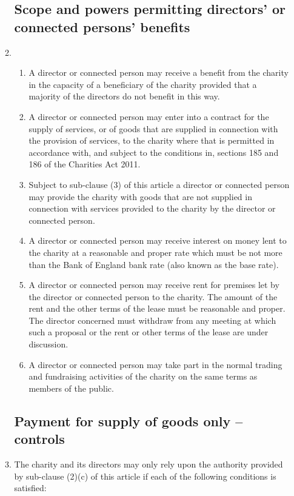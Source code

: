 \documentclass{article}
\begin{document}
\begin{enumerate}[label=\arabic*]
\begin{enumerate}[label=(\arabic*)]
        \subsection{Scope and powers permitting directors' or connected persons' benefits}
        \item \begin{enumerate}[label=(\alph*)]
            \item A director or connected person may receive a benefit from
            the charity in the capacity of a beneficiary of the charity
            provided that a majority of the directors do not benefit in
            this way.
            \item A director or connected person may enter into a contract
            for the supply of services, or of goods that are supplied in
            connection with the provision of services, to the charity
            where that is permitted in accordance with, and subject
            to the conditions in, sections 185 and 186 of the Charities
            Act 2011.
            \item Subject to sub-clause (3) of this article a director or
            connected person may provide the charity with goods
            that are not supplied in connection with services provided
            to the charity by the director or connected person.
            \item A director or connected person may receive interest on
            money lent to the charity at a reasonable and proper rate
            which must be not more than the Bank of England bank
            rate (also known as the base rate).
            \item A director or connected person may receive rent for
            premises let by the director or connected person to the
            charity. The amount of the rent and the other terms of
            the lease must be reasonable and proper. The director
            concerned must withdraw from any meeting at which
            such a proposal or the rent or other terms of the lease are
            under discussion.
            \item A director or connected person may take part in the
            normal trading and fundraising activities of the charity on
            the same terms as members of the public.
        \end{enumerate}
        
        \subsection{Payment for supply of goods only – controls}
        \item The charity and its directors may only rely upon the authority
        provided by sub-clause (2)(c) of this article if each of the
        following conditions is satisfied:
        

\end{enumerate}
\end{enumerate}
\end{document}
